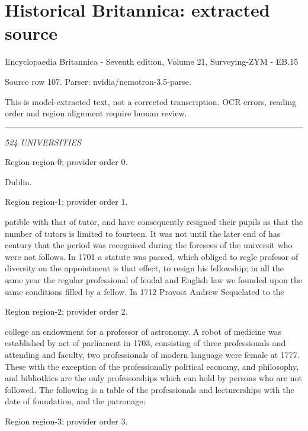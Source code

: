 \documentclass[11pt]{article}
\begin{document}
\section*{Historical Britannica: extracted source}
Encyclopaedia Britannica - Seventh edition, Volume 21, Surveying-ZYM - EB.15\par
{\small Source row 107. Parser: nvidia/nemotron-3.5-parse.\par}
{\small This is model-extracted text, not a corrected transcription. OCR errors, reading order and region alignment require human review.\par}
\hrule\medskip
{\small\itshape 524 UNIVERSITIES\par}

{\scriptsize\color{gray} Region region-0; provider order 0.\par}
\medskip

Dublin.
\par

{\scriptsize\color{gray} Region region-1; provider order 1.\par}
\medskip

patible with that of tutor, and have consequently resigned their pupils as that the number of tutors is limited to fourteen. It was not until the later end of has century that the period was recognised during the foresees of the universit who were not follows. In 1701 a statute was passed, which obliged to regle profesor of diversity on the appointment is that effect, to resign his fellowship; in all the same year the regular professional of feudal and English law we founded upon the same conditions filled by a fellow. In 1712 Provost Andrew Sequelated to the
\par

{\scriptsize\color{gray} Region region-2; provider order 2.\par}
\medskip

college an endowment for a professor of astronomy. A robot of medicine was established by act of parliament in 1703, consisting of three professionals and attending and faculty, two professionals of modern language were female at 1777. These with the exception of the professionally political economy, and philosophy, and bibliotkics are the only professorships which can hold by persons who are not followed. The following is a table of the professionals and lecturerships with the date of foundation, and the patronage:
\par

{\scriptsize\color{gray} Region region-3; provider order 3.\par}
\medskip
\end{document}
